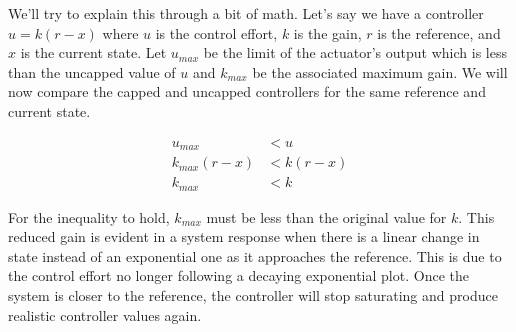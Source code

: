 We'll try to explain this through a bit of math. Let's say we have a controller
$u = k(r - x)$ where $u$ is the control effort, $k$ is the gain, $r$ is the
reference, and $x$ is the current state. Let $u_{max}$ be the limit of the
actuator's output which is less than the uncapped value of $u$ and $k_{max}$ be
the associated maximum gain. We will now compare the capped and uncapped
controllers for the same reference and current state.

\begin{align*}
  u_{max} &< u \\
  k_{max}(r - x) &< k(r - x) \\
  k_{max} &< k
\end{align*}

For the inequality to hold, $k_{max}$ must be less than the original value for
$k$. This reduced gain is evident in a system response when there is a linear
change in state instead of an exponential one as it approaches the reference.
This is due to the control effort no longer following a decaying exponential
plot. Once the system is closer to the reference, the controller will stop
saturating and produce realistic controller values again.
